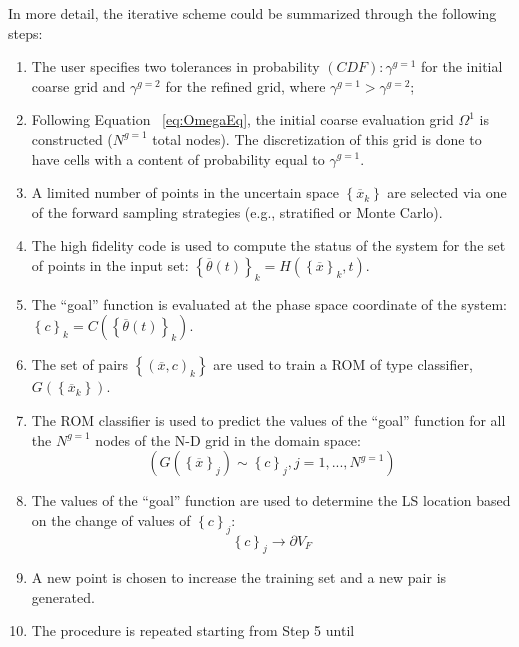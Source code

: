 In more detail, the iterative scheme could be summarized through the
following steps:
\begin{enumerate}
  \item The user specifies two tolerances in probability $(CDF):
  \gamma^{g=1}$ for the initial coarse grid and $\gamma^{g=2}$
  for the refined grid, where  $ \gamma^{g=1} >  \gamma^{g=2}$;
  \item Following Equation ~\ref{eq:OmegaEq}, the initial coarse evaluation
  grid $\Omega^{1}$ is constructed ($N^{g=1}$ total nodes). The
  discretization of this grid is done to have cells with a content of
  probability equal to $\gamma^{g=1}$.
  \item A limited number of points in the uncertain space $\left \{
  \overline{x}_{k} \right \}$ are selected via one of the forward
  sampling strategies (e.g., stratified or Monte Carlo).
  \item The high fidelity code is used to compute the status of the
  system for the set of points in the input set:
  $
  \left \{ \overline{\theta}(t)\right \}_{k} = H\left ( \left \{ \overline{x} \right
  \}_{k},t \right )
  $.
  \item The ``goal'' function is evaluated at the phase space coordinate
  of the system:
  $\left \{ c \right \}_{k} = C\left ( \left \{ \overline{\theta}(t)\right \}_{k}
  \right )$.
   \item The set of pairs $\left \{ \left ( \overline{x},c \right )_{k} \right \}$
   are used to train a ROM of type classifier, $G\left ( \left \{
   \overline{x}_{k} \right \} \right )$.
   \item The ROM classifier is used to predict the values of the ``goal''
   function for all the $N^{g=1}$ nodes of the N-D grid in the domain
   space:
   \begin{equation}
   \left (G\left ( \left \{ \overline{x} \right \}_{j} \right ) \sim \left \{ c \right
   \}_{j}, j=1,...,N^{g=1}  \right )
    \end{equation}
    \item The values of the ``goal''  function are used to determine the
    LS location based on the change of values of  $\left \{ c \right
    \}_{j}$:
    \begin{equation}
    \left \{ c \right \}_{j}\rightarrow \partial V_{F}
     \end{equation}
     \item A new point is chosen to increase the training set and a new
     pair is generated.
     \item The procedure is repeated starting from Step 5 until

\end{enumerate}
